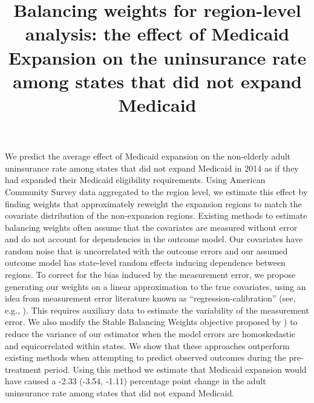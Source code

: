 \documentclass[aoas]{imsart}
\theoremstyle{plain}
\theoremstyle{remark}
\begin{document}
\begin{frontmatter}
\title{Balancing weights for region-level analysis: the effect of Medicaid Expansion on the uninsurance rate among states that did not expand Medicaid}


\begin{flushleft}
We predict the average effect of Medicaid expansion on the non-elderly adult uninsurance rate among states that did not expand Medicaid in 2014 as if they had expanded their Medicaid eligibility requirements. Using American Community Survey data aggregated to the region level, we estimate this effect by finding weights that approximately reweight the expansion regions to match the covariate distribution of the non-expansion regions. Existing methods to estimate balancing weights often assume that the covariates are measured without error and do not account for dependencies in the outcome model. Our covariates have random noise that is uncorrelated with the outcome errors and our assumed outcome model has state-level random effects inducing dependence between regions. To correct for the bias induced by the measurement error, we propose generating our weights on a linear approximation to the true covariates, using an idea from measurement error literature known as ``regression-calibration'' (see, e.g., \cite{carroll2006measurement}). This requires auxiliary data to estimate the variability of the measurement error. We also modify the Stable Balancing Weights objective proposed by \cite{zubizarreta2015stable}) to reduce the variance of our estimator when the model errors are homoskedastic and equicorrelated within states. We show that these approaches outperform existing methods when attempting to predict observed outcomes during the pre-treatment period. Using this method we estimate that Medicaid expansion would have caused a -2.33 (-3.54, -1.11) percentage point change in the adult uninsurance rate among states that did not expand Medicaid.
\end{flushleft}


\begin{keyword}
\end{keyword}

\end{frontmatter}
\end{document}
